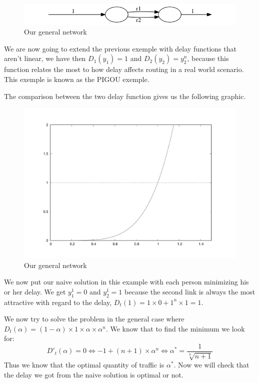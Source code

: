 \begin{figure}[h]
\centering
\includegraphics[scale=0.5]{output2.png}
\caption{Our general network}
\end{figure}

We are now going to extend the previous exemple with delay functions that aren't linear, we have then $D_1(y_1) = 1$ and $D_2(y_2) = y^n_2 $, because this function relates the most to how delay affects routing in a real world scenario. This exemple is known as the PIGOU exemple.

The comparison between the two delay function gives us the following graphic.

\begin{figure}[h]
\centering
\includegraphics[scale=0.2]{exo2.pdf}
\caption{Our general network}
\end{figure}

We now put our naive solution in this example with each person minimizing his or her delay. We get $y^1_1 = 0$ and $y^1_2 = 1$ because the second link is always the most attractive with regard to the delay, $D_t(1) = 1 \times 0 + 1^n \times 1 = 1$.

We now try to solve the problem in the general case where $D_t(\alpha ) = (1 - \alpha ) \times 1 \times \alpha \times \alpha ^n$. We know that to find the minimum we look for: $$D'_t(\alpha ) = 0 \iff -1 + (n + 1) \times \alpha ^n \iff \alpha ^* = \frac{1}{{\sqrt[n]{n+1}}}$$ Thus we know that the optimal quantity of traffic is $\alpha ^*$. Now we will check that the delay we got from the naive solution is optimal or not.

